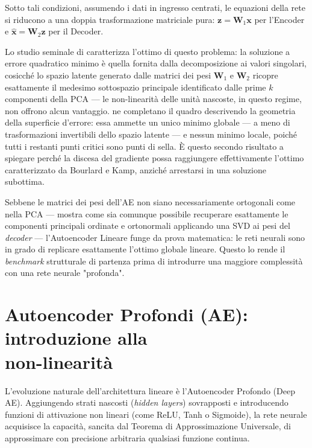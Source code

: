 Sotto tali condizioni, assumendo i dati in ingresso centrati, le equazioni della rete si riducono a una doppia trasformazione matriciale pura: $\mathbf{z} = \mathbf{W}_1 \mathbf{x}$ per l'Encoder e $\mathbf{\hat{x}} = \mathbf{W}_2 \mathbf{z}$ per il Decoder.

Lo studio seminale di \citet{bourlard1988autoassociation} caratterizza l'ottimo di questo problema: la soluzione a errore quadratico minimo è quella fornita dalla decomposizione ai valori singolari, cosicché lo spazio latente generato dalle matrici dei pesi $\mathbf{W}_1$ e $\mathbf{W}_2$ ricopre esattamente il medesimo sottospazio principale identificato dalle prime $k$ componenti della PCA --- le non-linearità delle unità nascoste, in questo regime, non offrono alcun vantaggio. \citet{baldi1989neural} ne completano il quadro descrivendo la geometria della superficie d'errore: essa ammette un unico minimo globale --- a meno di trasformazioni invertibili dello spazio latente --- e nessun minimo locale, poiché tutti i restanti punti critici sono punti di sella. È questo secondo risultato a spiegare perché la discesa del gradiente possa raggiungere effettivamente l'ottimo caratterizzato da Bourlard e Kamp, anziché arrestarsi in una soluzione subottima.

Sebbene le matrici dei pesi dell'AE non siano necessariamente ortogonali come nella PCA --- \citet{plaut2018principal} mostra come sia comunque possibile recuperare esattamente le componenti principali ordinate e ortonormali applicando una SVD ai pesi del \emph{decoder} --- l'Autoencoder Lineare funge da prova matematica: le reti neurali sono in grado di replicare esattamente l'ottimo globale lineare. Questo lo rende il \emph{benchmark} strutturale di partenza prima di introdurre una maggiore complessità con una rete neurale "profonda".

\section[Autoencoder Profondi (AE): introduzione alla non-linearità]%
        {Autoencoder Profondi (AE): introduzione alla\\ non-linearità}
\label{sec:deep_ae}

L'evoluzione naturale dell'architettura lineare è l'Autoencoder Profondo (Deep AE). Aggiungendo strati nascosti (\emph{hidden layers}) sovrapposti e introducendo funzioni di attivazione non lineari (come ReLU, Tanh o Sigmoide), la rete neurale acquisisce la capacità, sancita dal Teorema di Approssimazione Universale, di approssimare con precisione arbitraria qualsiasi funzione continua.


